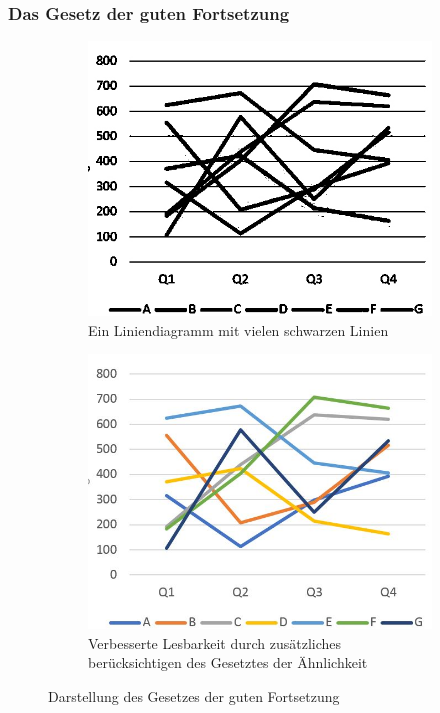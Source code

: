 \subsubsection{Das Gesetz der guten Fortsetzung}
\begin{figure}[ht]
\begin{subfigure}{.5\linewidth}
  \centering
  \includegraphics[width=.95\linewidth]{img/gFort}  
  \caption{Ein Liniendiagramm mit vielen schwarzen Linien}
  \label{fig:fort1}
\end{subfigure}
\begin{subfigure}{.5\linewidth}
  \centering
  \includegraphics[width=.95\linewidth]{img/gFortC}  
  \caption{Verbesserte Lesbarkeit durch zusätzliches berücksichtigen des Gesetztes der Ähnlichkeit}
  \label{fig:fort2}
\end{subfigure}
\caption[Gesetz der Fortsetzung]{Darstellung des Gesetzes der guten Fortsetzung}
\label{fig:fort}
\end{figure}

